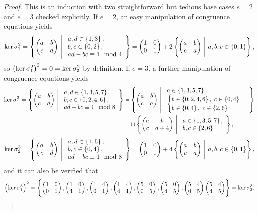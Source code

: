 \begin{proof}
This is an induction with two straightforward but tedious base cases $ e = 2 $ and $ e = 3 $ checked explicitly. If $ e = 2 $, an easy manipulation of congruence equations yields
$$ \ker \sigma_1^2 = \cbr{\twobytwo{a}{b}{c}{d} \st \begin{array}{l} a, d \in \cbr{1, 3}, \\ b, c \in \cbr{0, 2}, \\ ad - bc \equiv 1 \mod 4 \end{array}} = \twobytwo{1}{0}{0}{1} + 2\cbr{\twobytwo{a}{b}{c}{a} \st a, b, c \in \cbr{0, 1}}, $$
so $ \br{\ker \sigma_1^2}^2 = 0 = \ker \sigma_2^2 $ by definition. If $ e = 3 $, a further manipulation of congruence equations yields
\begin{align*}
\ker \sigma_1^3
= \cbr{\twobytwo{a}{b}{c}{d} \st \begin{array}{l} a, d \in \cbr{1, 3, 5, 7}, \\ b, c \in \cbr{0, 2, 4, 6}, \\ ad - bc \equiv 1 \mod 8 \end{array}}
= & \cbr{\twobytwo{a}{b}{c}{a} \st \begin{array}{l} a \in \cbr{1, 3, 5, 7}, \\ \begin{cases} b \in \cbr{0, 2, 4, 6}, \ c \in \cbr{0, 4} \\ b \in \cbr{0, 4}, \ c \in \cbr{2, 6} \end{cases} \end{array}} \\
& \cup \cbr{\twobytwo{a}{b}{c}{a + 4} \st \begin{array}{l} a \in \cbr{1, 3, 5, 7}, \\ b, c \in \cbr{2, 6} \end{array}},
\end{align*}
$$ \ker \sigma_2^3 = \cbr{\twobytwo{a}{b}{c}{d} \st \begin{array}{l} a, d \in \cbr{1, 5}, \\ b, c \in \cbr{0, 4}, \\ ad - bc \equiv 1 \mod 8 \end{array}} = \twobytwo{1}{0}{0}{1} + 4\cbr{\twobytwo{a}{b}{c}{a} \st a, b, c \in \cbr{0, 1}}, $$
and it can also be verified that
$$ \br{\ker \sigma_1^3}^2 = \cbr{\twobytwo{1}{0}{0}{1}, \twobytwo{1}{0}{4}{1}, \twobytwo{1}{4}{0}{1}, \twobytwo{1}{4}{4}{1}, \twobytwo{5}{0}{0}{5}, \twobytwo{5}{0}{4}{5}, \twobytwo{5}{4}{0}{5} \twobytwo{5}{4}{4}{5}} = \ker \sigma_2^3. $$


\end{proof}
